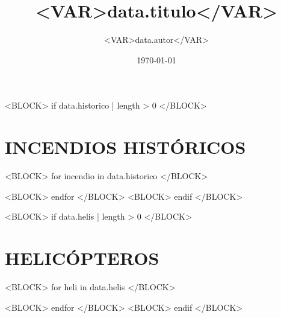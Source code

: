 \documentclass[spanish]{article}
\title{ <VAR>data.titulo</VAR> }
\author{ <VAR>data.autor</VAR> }
\date{\today}
\begin{document}
\maketitle	
\pagebreak

\tableofcontents
\pagebreak


<BLOCK> if data.historico | length > 0 </BLOCK>
\section{INCENDIOS HISTÓRICOS}
<BLOCK> for incendio in data.historico </BLOCK>

<BLOCK> endfor </BLOCK>
<BLOCK> endif </BLOCK>

<BLOCK> if data.helis | length > 0 </BLOCK>
\section{HELICÓPTEROS}
<BLOCK> for heli in data.helis </BLOCK>

<BLOCK> endfor </BLOCK>
<BLOCK> endif </BLOCK>
\end{document}
